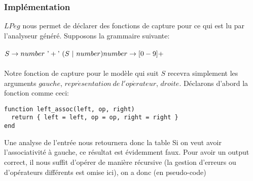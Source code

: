 \documentclass{article}
\begin{document}
\subsubsection{Implémentation}
$LPeg$ nous permet de déclarer des fonctions de capture pour ce qui est lu par l'analyseur généré. Supposons la grammaire suivante: \\ \\
\begin{math}
S \rightarrow number \ \textrm{'}+\textrm{'} \ (S \ | \ number) \\
number \rightarrow [0-9]+
\end{math} \\ \\
Notre fonction de capture pour le modèle qui suit $S$ recevra simplement les arguments $gauche$, $repr\acute{e}sentation \ de \ l'op\acute{e}rateur$, $droite$. Déclarons d'abord la fonction comme ceci:
\begin{verbatim}
function left_assoc(left, op, right)
  return { left = left, op = op, right = right }
end
\end{verbatim}
Une analyse de l'entrée  \noindent nous retournera donc la table 
\noindent Si on veut avoir l'associativité à gauche, ce résultat est évidemment faux. Pour avoir un output correct, il nous suffit d'opérer de manière récursive (la gestion d'erreurs ou d'opérateurs différents est omise ici), on a donc (en pseudo-code)
\end{document}
